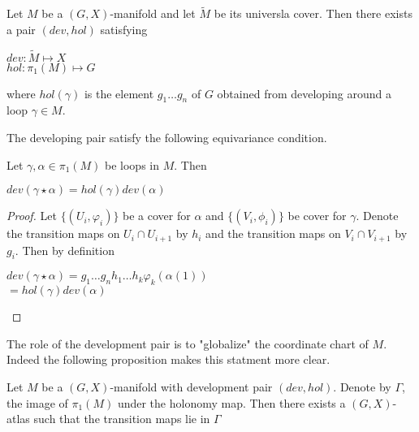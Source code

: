 \begin{corollary}
    Let $M$ be a $(G,X)$-manifold and let $\tilde{M}$ be its universla cover. Then
    there exists a pair $(dev, hol)$ satisfying
    \begin{center}
        $dev : \tilde{M} \mapsto X$\\
        $hol: \pi_1(M) \mapsto G$
    \end{center}
    where $hol(\gamma)$ is the element $g_1\dots g_n$ of $G$ obtained from
    developing around a loop $\gamma \in M$.
\end{corollary}

The developing pair satisfy the following equivariance condition.
\begin{lemma}
    Let $\gamma, \alpha \in \pi_1(M)$ be loops in $M$. Then

    \begin{center}
        $dev(\gamma \star \alpha) = hol(\gamma)dev(\alpha)$
    \end{center}
\end{lemma}

\begin{proof}
    Let $\{(U_i, \varphi_i)\}$ be a cover for $\alpha$ and $\{(V_i, \phi_i)\}$ be
    cover for $\gamma$. Denote the transition maps on $U_i \cap U_{i+1}$ by $h_i$
    and the transition maps on $V_i \cap V_{i+1}$ by $g_i$. Then by definition
    \begin{center}
        $dev(\gamma \star \alpha) = g_1 \dots g_n h_1 \dots h_k \varphi_k(\alpha(1))$\\
        $= hol(\gamma)dev(\alpha)$
    \end{center}
\end{proof}

The role of the development pair is to "globalize" the coordinate chart of $M$.
Indeed the following proposition makes this statment more clear.

\begin{prop}
    Let $M$ be a $(G,X)$-manifold with development pair $(dev, hol)$. Denote
    by $\Gamma$, the image of $\pi_1(M)$ under the holonomy map. Then there
    exists a $(G,X)$-atlas such that the transition maps lie in $\Gamma$
\end{prop}

